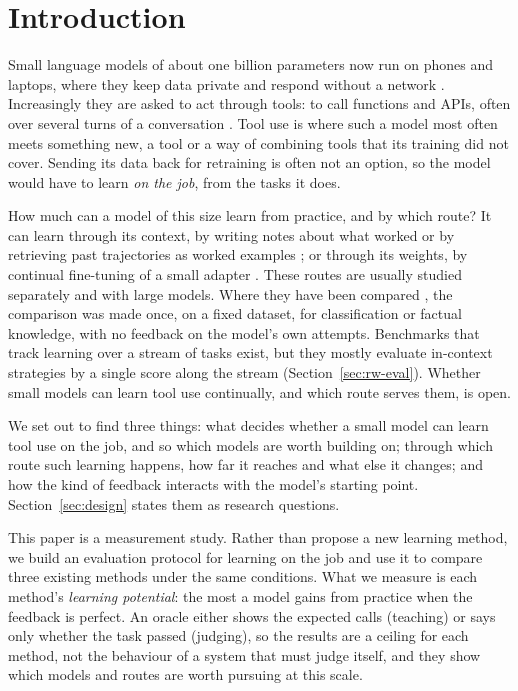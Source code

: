 \documentclass[a4paper,fleqn]{cas-dc}
\begin{document}
\section{Introduction}\label{sec:intro}
Small language models of about one billion parameters now run on phones and laptops, where they keep data private and
respond without a network \citep{wang2025comprehensive}. Increasingly they are asked to act through tools: to call
functions and APIs, often over several turns of a conversation \citep{patil2025berkeley}. Tool use is where such a model
most often meets something new, a tool or a way of combining tools that its training did not cover. Sending its data
back for retraining is often not an option, so the model would have to learn \emph{on the job}, from the tasks it does.

How much can a model of this size learn from practice, and by which route? It can learn through its context, by
writing notes about what worked \citep{suzgun2026dynamic,zhang2026agentic} or by retrieving past trajectories as worked
examples \citep{zheng2024synapse}; or through its weights, by continual fine-tuning of a small adapter
\citep{hu2022lora}. These routes are usually studied separately and with large models. Where they have been compared
\citep{mosbach2023few,ovadia2024fine,soudani2024fine}, the comparison was made once, on a fixed dataset, for classification or factual knowledge, with no feedback on the model's own attempts. Benchmarks that track learning over a
stream of tasks exist, but they mostly evaluate in-context strategies by a single score along the stream
(Section~\ref{sec:rw-eval}). Whether small models can learn tool use continually, and which route serves them, is open.

We set out to find three things: what decides whether a small model can learn tool use on the job, and so which models
are worth building on; through which route such learning happens, how far it reaches and what else it changes; and how
the kind of feedback interacts with the model's starting point. Section~\ref{sec:design} states them as research
questions.

This paper is a measurement study. Rather than propose a new learning method, we build an evaluation protocol for
learning on the job and use it to compare three existing methods under the same conditions. What we measure is each
method's \emph{learning potential}: the most a model gains from practice when the feedback is perfect. An oracle either
shows the expected calls (teaching) or says only whether the task passed (judging), so the results are a ceiling for
each method, not the behaviour of a system that must judge itself, and they show which models and routes are worth pursuing at this scale.
\end{document}
